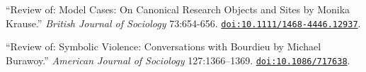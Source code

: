 

\ind ``Review of: Model Cases: On Canonical Research Objects and Sites by Monika Krause.'' {\em British Journal of Sociology} 73:654-656. \href{https://doi.org/10.1111/1468-4446.12937}{\nolinkurl{doi:10.1111/1468-4446.12937}}. 

\ind ``Review of: Symbolic Violence: Conversations with Bourdieu by Michael Burawoy.'' {\em American Journal of Sociology} 127:1366–1369. \href{https://doi.org/10.1086/717638}{\nolinkurl{doi:10.1086/717638}}.
